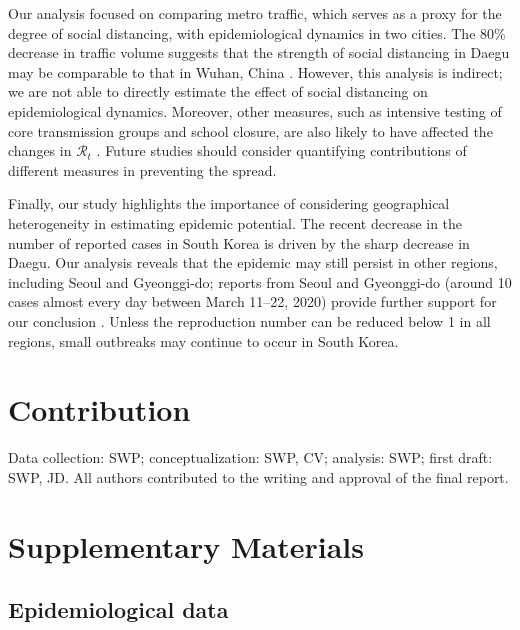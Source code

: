 \documentclass[12pt]{article}
\begin{document}
Our analysis focused on comparing metro traffic, which serves as a proxy for the degree of social distancing, with epidemiological dynamics in two cities.
The 80\% decrease in traffic volume suggests that the strength of social distancing in Daegu may be comparable to that in Wuhan, China \citep{lai2020effect}.
However, this analysis is indirect; we are not able to directly estimate the effect of social distancing on epidemiological dynamics.
Moreover, other measures, such as intensive testing of core transmission groups and school closure, are also likely to have affected the changes in $\mathcal R_t$ \citep{kcdc}.
Future studies should consider quantifying contributions of different measures in preventing the spread.

Finally, our study highlights the importance of considering geographical heterogeneity in estimating epidemic potential.
The recent decrease in the number of reported cases in South Korea is driven by the sharp decrease in Daegu.
Our analysis reveals that the epidemic may still persist in other regions, including Seoul and Gyeonggi-do;
reports from Seoul and Gyeonggi-do (around 10 cases almost every day between March 11--22, 2020) provide further support for our conclusion \citep{kcdc}.
Unless the reproduction number can be reduced below 1 in all regions, small outbreaks may continue to occur in South Korea.

\section*{Contribution}

Data collection: SWP; conceptualization: SWP, CV; analysis: SWP; first draft: SWP, JD. All authors contributed to the writing and approval of the final report.

\pagebreak



\pagebreak

\renewcommand\thefigure{S\arabic{figure}}
\setcounter{figure}{0}    

\section*{Supplementary Materials}

\subsection*{Epidemiological data}
\end{document}
